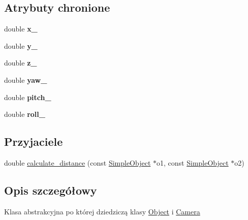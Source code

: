 \subsection*{Atrybuty chronione}
\begin{DoxyCompactItemize}
\item 
double {\bfseries x\+\_\+}\hypertarget{class_simple_object_a5ef9c7a8f7fb8ac661bff5dcb33983a7}{}\label{class_simple_object_a5ef9c7a8f7fb8ac661bff5dcb33983a7}

\item 
double {\bfseries y\+\_\+}\hypertarget{class_simple_object_ac80d26a13b1c0bd55403a947745b5f03}{}\label{class_simple_object_ac80d26a13b1c0bd55403a947745b5f03}

\item 
double {\bfseries z\+\_\+}\hypertarget{class_simple_object_a7adae5ef28bc1101e6a0341f1b97f4cd}{}\label{class_simple_object_a7adae5ef28bc1101e6a0341f1b97f4cd}

\item 
double {\bfseries yaw\+\_\+}\hypertarget{class_simple_object_a2223327221cd21410ac4d60fa1ad479a}{}\label{class_simple_object_a2223327221cd21410ac4d60fa1ad479a}

\item 
double {\bfseries pitch\+\_\+}\hypertarget{class_simple_object_aa4966ef233fe74cc77c0a75e97729221}{}\label{class_simple_object_aa4966ef233fe74cc77c0a75e97729221}

\item 
double {\bfseries roll\+\_\+}\hypertarget{class_simple_object_ae253b25a26259913b424129021885911}{}\label{class_simple_object_ae253b25a26259913b424129021885911}

\end{DoxyCompactItemize}
\subsection*{Przyjaciele}
\begin{DoxyCompactItemize}
\item 
double \hyperlink{class_simple_object_adbeedfd57e99d5aeab512c85ee1b6849}{calculate\+\_\+distance} (const \hyperlink{class_simple_object}{Simple\+Object} $\ast$o1, const \hyperlink{class_simple_object}{Simple\+Object} $\ast$o2)
\end{DoxyCompactItemize}


\subsection{Opis szczegółowy}
Klasa abstrakcyjna po której dziedziczą klasy \hyperlink{class_object}{Object} i \hyperlink{class_camera}{Camera} 

